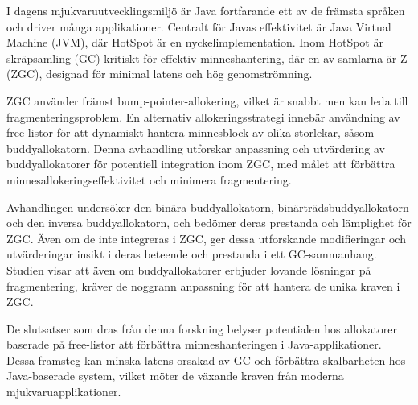 I dagens mjukvaruutvecklingsmiljö är Java fortfarande ett av de främsta språken och driver många applikationer. Centralt för Javas effektivitet är Java Virtual Machine (JVM), där HotSpot är en nyckelimplementation. Inom HotSpot är skräpsamling (GC) kritiskt för effektiv minneshantering, där en av samlarna är Z (ZGC), designad för minimal latens och hög genomströmning.

ZGC använder främst bump-pointer-allokering, vilket är snabbt men kan leda till fragmenteringsproblem. En alternativ allokeringsstrategi innebär användning av free-listor för att dynamiskt hantera minnesblock av olika storlekar, såsom buddyallokatorn. Denna avhandling utforskar anpassning och utvärdering av buddyallokatorer för potentiell integration inom ZGC, med målet att förbättra minnesallokeringseffektivitet och minimera fragmentering.

Avhandlingen undersöker den binära buddyallokatorn, binärträdsbuddyallokatorn och den inversa buddyallokatorn, och bedömer deras prestanda och lämplighet för ZGC. Även om de inte integreras i ZGC, ger dessa utforskande modifieringar och utvärderingar insikt i deras beteende och prestanda i ett GC-sammanhang. Studien visar att även om buddyallokatorer erbjuder lovande lösningar på fragmentering, kräver de noggrann anpassning för att hantera de unika kraven i ZGC.

De slutsatser som dras från denna forskning belyser potentialen hos allokatorer baserade på free-listor att förbättra minneshanteringen i Java-applikationer. Dessa framsteg kan minska latens orsakad av GC och förbättra skalbarheten hos Java-baserade system, vilket möter de växande kraven från moderna mjukvaruapplikationer.

